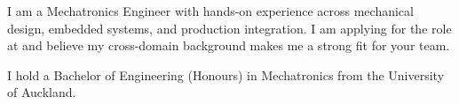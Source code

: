 I am a Mechatronics Engineer with hands-on experience across mechanical design,
embedded systems, and production integration. I am applying for the \jobTitle{}
role at \companyName{} and believe my cross-domain background makes me a strong fit
for your team.

I hold a Bachelor of Engineering (Honours) in Mechatronics from the University of Auckland.
